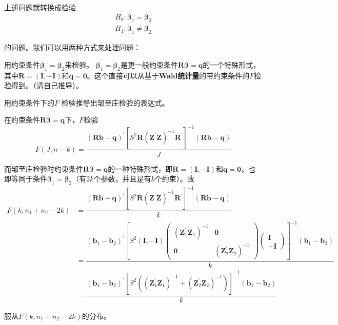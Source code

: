 	上述问题就转换成检验
	$$ \begin{array}{l}
		H_{0}: \boldsymbol{\beta}_{1}=\boldsymbol{\beta}_{2} \\
		H_{1}: \boldsymbol{\beta}_{1} \neq \boldsymbol{\beta}_{2}
	\end{array} $$

	的问题。我们可以用两种方式来处理问题：

		{ } 用约束条件$ \boldsymbol{\beta}_{1}=\boldsymbol{\beta}_{2} $来检验。
		$ \boldsymbol{\beta}_{1}=\boldsymbol{\beta}_{2} $是更一般约束条件$ \boldsymbol{R\beta}=\boldsymbol{q} $的一个特殊形式，其中$ \boldsymbol{R}=(\boldsymbol{I},-\boldsymbol{I}) $和$ \boldsymbol{q}=\boldsymbol{0} $。这个直接可以从基于{\bf Wald统计量}的带约束条件的$ F $检验得到。（请自己推导）。
		
		\begin{myexample}
			用约束条件下的$ F $ 检验推导出邹至庄检验的表达式。
			\begin{myproof}
				在约束条件$ \boldsymbol{R\beta}=\boldsymbol{q} $下，$ F $检验
					$$ F(J, n-k)=\frac{(\boldsymbol{Rb}-\boldsymbol{q})^{\prime}\left[S^{2} \boldsymbol{R}\left(\boldsymbol{Z}^{\prime} 
					\boldsymbol{Z}\right)^{-1} \boldsymbol{R}^{\prime}\right]^{-1}(\boldsymbol{Rb}-\boldsymbol{q})}{J} $$

					而邹至庄检验时约束条件$ \boldsymbol{R\beta}=\boldsymbol{q} $的一种特殊形式，即$ \boldsymbol{R}=(\boldsymbol{I},-\boldsymbol{I}) $和$ \boldsymbol{q}=\boldsymbol{0} $，也即等同于条件$ \boldsymbol{\beta}_{1}=\boldsymbol{\beta}_{2} $（有$ 2k $个参数，并且是有$ k $个约束）。故
					\begin{align*}
						F\left(k, n_{1}+n_{2}-2 k\right) & =  \dfrac{(\boldsymbol{Rb}-\boldsymbol{q})^{\prime}\left[S^{2} \boldsymbol{R}\left(\boldsymbol{Z}^{\prime} \boldsymbol{Z}\right)^{-1} \boldsymbol{R}^{\prime}\right]^{-1}(\boldsymbol{Rb}-\boldsymbol{q})}{k} \\
						& =  \dfrac{\left(\boldsymbol{b}_{1}-\boldsymbol{b}_{2}\right)^{\prime}\left[S^{2}(\boldsymbol{I},-\boldsymbol{I})\left(\begin{array}{cc}
								\left(\boldsymbol{Z}_{1}^{\prime} \boldsymbol{Z}_{1}\right)^{-1} & \boldsymbol{0} \\
								\boldsymbol{0} & \left(\boldsymbol{Z}_{2}^{\prime} \boldsymbol{Z}_{2}\right)^{-1}
							\end{array}\right)\left(\begin{array}{c}
								\boldsymbol{I} \\
								-\boldsymbol{I}
							\end{array}\right)\right]^{-1}\left(\boldsymbol{b}_{1}-\boldsymbol{b}_{2}\right)}{k} \\
						& =  \dfrac{\left(\boldsymbol{b}_{1}-\boldsymbol{b}_{2}\right)^{\prime}\left[S^{2}\left(\left(\boldsymbol{Z}_{1}^{\prime} \boldsymbol{Z}_{1}\right)^{-1}+\left(\boldsymbol{Z}_{2}^{\prime} \boldsymbol{Z}_{2}\right)^{-1}\right)\right]^{-1}\left(\boldsymbol{b}_{1}-\boldsymbol{b}_{2}\right)}{k}
					\end{align*}

					服从$ F\left(k, n_{1}+n_{2}-2 k\right) $的分布。
			\end{myproof}
		\end{myexample}
		

